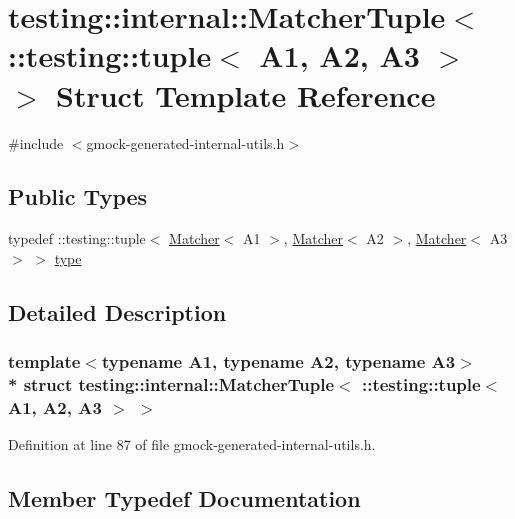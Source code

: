 \hypertarget{structtesting_1_1internal_1_1_matcher_tuple_3_01_1_1testing_1_1tuple_3_01_a1_00_01_a2_00_01_a3_01_4_01_4}{}\section{testing\+:\+:internal\+:\+:Matcher\+Tuple$<$ \+:\+:testing\+:\+:tuple$<$ A1, A2, A3 $>$ $>$ Struct Template Reference}
\label{structtesting_1_1internal_1_1_matcher_tuple_3_01_1_1testing_1_1tuple_3_01_a1_00_01_a2_00_01_a3_01_4_01_4}


{\ttfamily \#include $<$gmock-\/generated-\/internal-\/utils.\+h$>$}

\subsection*{Public Types}
\begin{DoxyCompactItemize}
\item 
typedef \+::testing\+::tuple$<$ \hyperlink{classtesting_1_1_matcher}{Matcher}$<$ A1 $>$, \hyperlink{classtesting_1_1_matcher}{Matcher}$<$ A2 $>$, \hyperlink{classtesting_1_1_matcher}{Matcher}$<$ A3 $>$ $>$ \hyperlink{structtesting_1_1internal_1_1_matcher_tuple_3_01_1_1testing_1_1tuple_3_01_a1_00_01_a2_00_01_a3_01_4_01_4_a14ce558da46f2d3829b2dfacdab2c980}{type}
\end{DoxyCompactItemize}


\subsection{Detailed Description}
\subsubsection*{template$<$typename A1, typename A2, typename A3$>$\\*
struct testing\+::internal\+::\+Matcher\+Tuple$<$ \+::testing\+::tuple$<$ A1, A2, A3 $>$ $>$}



Definition at line 87 of file gmock-\/generated-\/internal-\/utils.\+h.



\subsection{Member Typedef Documentation}
